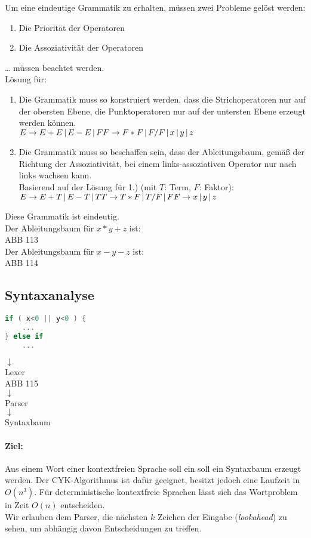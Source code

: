 Um eine eindeutige Grammatik zu erhalten, müssen zwei Probleme gelöst werden:
\begin{enumerate}
\item Die Priorität der Operatoren
\item Die Assoziativität der Operatoren
\end{enumerate}
… müssen beachtet werden.\\
Lösung für:
\begin{enumerate}
\item Die Grammatik muss so konstruiert werden, dass die Strichoperatoren nur auf der obersten Ebene, die Punktoperatoren nur auf der untersten Ebene erzeugt werden können.\\
$E\to E+E \,|\, E-E \,|\, F \\
F \to F*F \,|\, F/F \,|\, x \,|\, y \,|\, z$
\item Die Grammatik muss so beschaffen sein, dass der Ableitungsbaum, gemäß der Richtung der Assoziativität, bei einem links-assoziativen Operator nur nach links wachsen kann.\\
Basierend auf der Lösung für 1.) (mit $T$: Term, $F$: Faktor):\\
$E\to E+T \,|\, E-T \,|\, T \\
T \to T*F \,|\, T/F \,|\, F\\
F \to x \,|\, y \,|\, z$
\end{enumerate}
Diese Grammatik ist eindeutig.\\
Der Ableitungsbaum für $x*y+z$ ist:\\
ABB 113\\
Der Ableitungsbaum für $x-y-z$ ist:\\
ABB 114

\subsection{Syntaxanalyse}

\begin{lstlisting}[language=C]
if ( x<0 || y<0 ) {
	...
} else if
	...
\end{lstlisting}
$\downarrow$\\
Lexer\\
ABB 115\\
$\downarrow$\\
Parser\\
$\downarrow$\\
Syntaxbaum
\paragraph{Ziel:} Aus einem Wort einer kontextfreien Sprache soll ein soll ein Syntaxbaum erzeugt werden. Der CYK-Algorithmus ist dafür geeignet, besitzt jedoch eine Laufzeit in $O(n^3)$. Für deterministische kontextfreie Sprachen lässt sich das Wortproblem in Zeit $O(n)$ entscheiden.\\
Wir erlauben dem Parser, die nächsten $k$ Zeichen der Eingabe (\emph{lookahead}) zu sehen, um abhängig davon Entscheidungen zu treffen.

